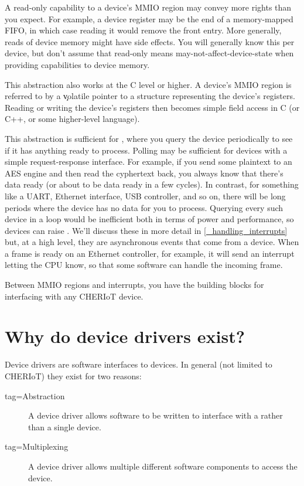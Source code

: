 \begin{caution}
A read-only capability to a device's MMIO region may convey more rights than you expect.
For example, a device register may be the end of a memory-mapped FIFO, in which case reading it would remove the front entry.
More generally, reads of device memory might have side effects.
You will generally know this per device, but don't assume that read-only means may-not-affect-device-state when providing capabilities to device memory.
\end{caution}

This abstraction also works at the C level or higher.
A device's MMIO region is referred to by a \c{volatile} pointer to a structure representing the device's registers.
Reading or writing the device's registers then becomes simple field access in C (or C++, or some higher-level language).

This abstraction is sufficient for , where you query the device periodically to see if it has anything ready to process.
Polling may be sufficient for devices with a simple request-response interface.
For example, if you send some plaintext to an AES engine and then read the cyphertext back, you always know that there's data ready (or about to be data ready in a few cycles).
In contrast, for something like a UART, Ethernet interface, USB controller, and so on, there will be long periods where the device has no data for you to process.
Querying every such device in a loop would be inefficient both in terms of power and performance, so devices can raise .
We'll discuss these in more detail in \ref{_handling_interrupts} but, at a high level, they are asynchronous events that come from a device.
When a frame is ready on an Ethernet controller, for example, it will send an interrupt letting the CPU know, so that some software can handle the incoming frame.

Between MMIO regions and interrupts, you have the building blocks for interfacing with any CHERIoT device.

\section{Why do device drivers exist?}

Device drivers are software interfaces to devices.
In general (not limited to CHERIoT) they exist for two reasons:

\begin{description}
	\item[tag=Abstraction]{ A device driver allows software to be written to interface with a  rather than a single device.}
	\item[tag=Multiplexing]{ A device driver allows multiple different software components to access the device.}
\end{description}

